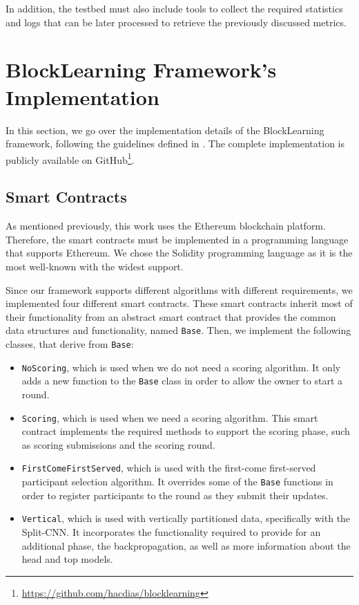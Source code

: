In addition, the testbed must also include tools to collect the required statistics and logs that can be later processed to retrieve the previously discussed metrics.

\section{BlockLearning Framework's Implementation}

In this section, we go over the implementation details of the BlockLearning framework, following the guidelines defined in . The complete implementation is publicly available on GitHub\footnote{\url{https://github.com/hacdias/blocklearning}}.

\subsection{Smart Contracts}

As mentioned previously, this work uses the Ethereum \cite{wood2014ethereum} blockchain platform. Therefore, the smart contracts must be implemented in a programming language that supports Ethereum. We chose the Solidity \cite{solidity} programming language as it is the most well-known with the widest support.

Since our framework supports different algorithms with different requirements, we implemented four different smart contracts. These smart contracts inherit most of their functionality from an abstract smart contract that provides the common data structures and functionality, named \texttt{Base}. Then, we implement the following classes, that derive from \texttt{Base}:

\begin{itemize}
    \item \texttt{NoScoring}, which is used when we do not need a scoring algorithm. It only adds a new function to the \texttt{Base} class in order to allow the owner to start a round.
    
    \item \texttt{Scoring}, which is used when we need a scoring algorithm. This smart contract implements the required methods to support the scoring phase, such as scoring submissions and the scoring round.
    
    \item \texttt{FirstComeFirstServed}, which is used with the first-come first-served participant selection algorithm. It overrides some of the \texttt{Base} functions in order to register participants to the round as they submit their updates.
    
    \item \texttt{Vertical}, which is used with vertically partitioned data, specifically with the Split-CNN. It incorporates the functionality required to provide for an additional phase, the backpropagation, as well as more information about the head and top models.
\end{itemize}

